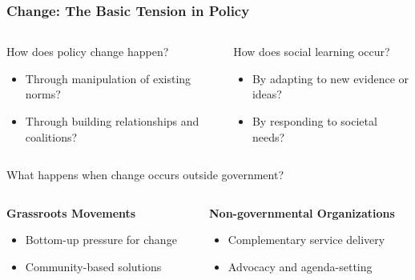 \documentclass[10pt]{beamer}
\begin{document}
\begin{frame}
\frametitle{Change: The Basic Tension in Policy}

\begin{columns}
\begin{column}{0.48\textwidth}
\begin{block}{How does policy change happen?}
\pause
\begin{itemize}
\item Through manipulation of existing norms?
\item Through building relationships and coalitions?
\end{itemize}
\end{block}
\end{column}

\begin{column}{0.48\textwidth}
\begin{block}{How does social learning occur?}
\pause
\begin{itemize}
\item By adapting to new evidence or ideas?
\item By responding to societal needs?
\end{itemize}
\end{block}
\end{column}
\end{columns}

\pause
\vspace{0.3cm}

\begin{block}{What happens when change occurs outside government?}
\begin{columns}
\begin{column}{0.48\textwidth}
\textbf{Grassroots Movements}
\begin{itemize}
\item Bottom-up pressure for change
\item Community-based solutions
\end{itemize}
\end{column}

\begin{column}{0.48\textwidth}
\textbf{Non-governmental Organizations}
\begin{itemize}
\item Complementary service delivery
\item Advocacy and agenda-setting
\end{itemize}
\end{column}
\end{columns}
\end{block}

\end{frame}
\end{document}
